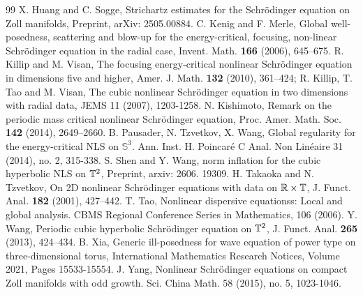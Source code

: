 \documentclass[10pt,a4paper]{amsart}
\numberwithin{equation}{section}
\begin{document}
\begin{thebibliography}{99}
 X. Huang and C. Sogge, Strichartz estimates for the Schr\"odinger equation on Zoll manifolds, Preprint, arXiv: 2505.00884.
 C. Kenig and F. Merle, Global well-posedness, scattering and blow-up for the energy-critical, focusing, non-linear Schr\"odinger equation in the radial case, Invent. Math. {\bf 166} (2006), 645--675.
 R. Killip and M. Visan, The focusing energy-critical nonlinear Schr\"odinger equation in dimensions five and higher, Amer. J. Math. {\bf 132} (2010), 361--424;
 R. Killip, T. Tao and M. Visan, The cubic nonlinear Schrödinger equation in two dimensions with radial data, JEMS 11 (2007), 1203-1258.
 N. Kishimoto, Remark on the periodic mass critical nonlinear Schr\"odinger equation, Proc. Amer. Math. Soc. {\bf 142} (2014), 2649--2660.
 B. Pausader, N. Tzvetkov, X. Wang, Global regularity for the energy-critical NLS on $\mathbb S^3$. Ann. Inst. H. Poincar\'{e} C Anal. Non Lin\'{e}aire 31 (2014), no. 2, 315-338.
 S. Shen and Y. Wang, norm inflation for the cubic hyperbolic NLS on $\Bbb T^2$, Preprint, arxiv: 2606. 19309.
 H. Takaoka and N. Tzvetkov, On 2D nonlinear Schr\"odinger equations with data on ${\Bbb R}\times\Bbb T$, J. Funct. Anal. {\bf 182} (2001), 427--442.
 T. Tao, Nonlinear dispersive equationss: Local and global analysis. CBMS Regional Conference Series in Mathematics, 106 (2006).
 Y. Wang, Periodic cubic hyperbolic Schr\"odinger equation on $\Bbb{T}^2$, J. Funct. Anal. {\bf 265} (2013), 424--434.
 B. Xia, Generic ill-posedness for wave equation of power type on three-dimensional torus, International Mathematics Research Notices, Volume 2021, Pages 15533-15554.
 J. Yang, Nonlinear Schr\"{o}dinger equations on compact Zoll manifolds with odd growth. Sci. China Math. 58 (2015), no. 5, 1023-1046.
\end{thebibliography}
\end{document}
